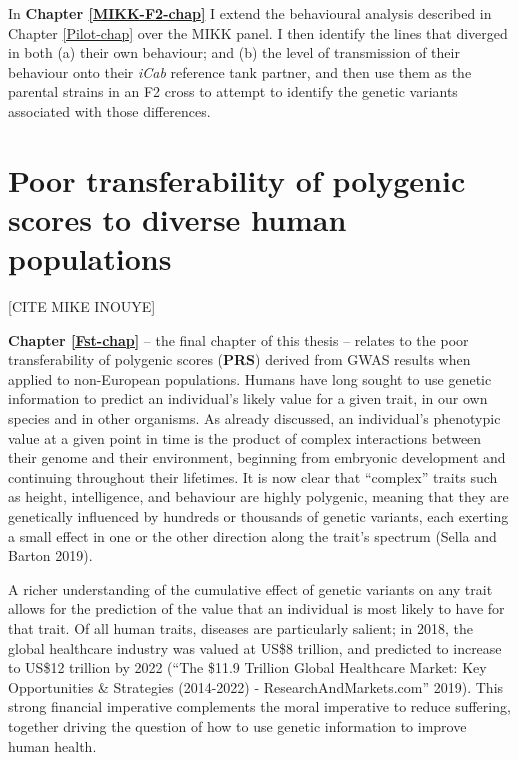 \documentclass[
]{book}
\begin{document}
In \textbf{Chapter \ref{MIKK-F2-chap}} I extend the behavioural analysis described in Chapter \ref{Pilot-chap} over the MIKK panel. I then identify the lines that diverged in both (a) their own behaviour; and (b) the level of transmission of their behaviour onto their \emph{\textcolor{iCab_424B4D}{iCab}} reference tank partner, and then use them as the parental strains in an F2 cross to attempt to identify the genetic variants associated with those differences.

\hypertarget{poor-transferability-of-polygenic-scores-to-diverse-human-populations}{%
\section{Poor transferability of polygenic scores to diverse human populations}\label{poor-transferability-of-polygenic-scores-to-diverse-human-populations}}

{[}CITE MIKE INOUYE{]}

\textbf{Chapter \ref{Fst-chap}} -- the final chapter of this thesis -- relates to the poor transferability of polygenic scores (\textbf{PRS}) derived from GWAS results when applied to non-European populations. Humans have long sought to use genetic information to predict an individual's likely value for a given trait, in our own species and in other organisms. As already discussed, an individual's phenotypic value at a given point in time is the product of complex interactions between their genome and their environment, beginning from embryonic development and continuing throughout their lifetimes. It is now clear that ``complex'' traits such as height, intelligence, and behaviour are highly polygenic, meaning that they are genetically influenced by hundreds or thousands of genetic variants, each exerting a small effect in one or the other direction along the trait's spectrum (Sella and Barton 2019).

A richer understanding of the cumulative effect of genetic variants on any trait allows for the prediction of the value that an individual is most likely to have for that trait. Of all human traits, diseases are particularly salient; in 2018, the global healthcare industry was valued at US\$8 trillion, and predicted to increase to US\$12 trillion by 2022 ({``The \$11.9 {Trillion Global Healthcare Market}: {Key Opportunities} \& {Strategies} (2014-2022) - {ResearchAndMarkets}.com''} 2019). This strong financial imperative complements the moral imperative to reduce suffering, together driving the question of how to use genetic information to improve human health.
\end{document}
